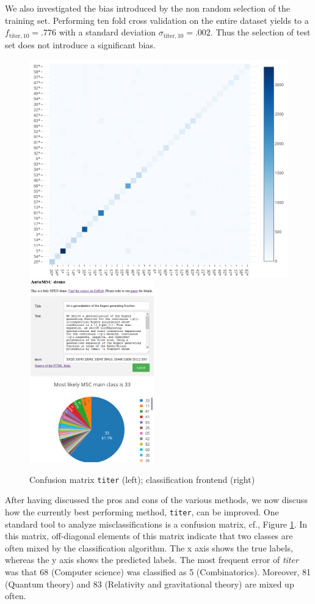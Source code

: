 We also investigated the bias introduced by the non random selection of the training set.
Performing ten fold cross validation on the entire dataset yields to a $f_\mathrm{titer,10}=.776$ with a standard deviation $\sigma_\mathrm{titer,10}=.002.$
Thus the selection of test set does not introduce a significant bias.

\begin{figure}[t]
  \centering
  \includegraphics[width=.48\textwidth]{confusion.png}
  \includegraphics[width=0.48\textwidth]{webFrontend.png}
  \caption{Confusion matrix \texttt{titer} (left); classification frontend (right)}\label{fgScreenshot}\label{fgConfusion}
\end{figure}
After having discussed the pros and cons of the various methods, we now discuss how the currently best performing method, \texttt{titer}, can be improved. 
One standard tool to analyze misclassifications is a confusion matrix, cf., Figure \ref{fgConfusion}.
In this matrix, off-diagonal elements of this matrix indicate that two classes are often mixed by the classification algorithm.
The x axis shows the true labels, whereas the y axis shows the predicted labels.
The most frequent error of \textit{titer} was that 68 (Computer science) was classified as 5 (Combinatorics).
Moreover, 81 (Quantum theory) and 83 (Relativity and gravitational theory) are mixed up often.


